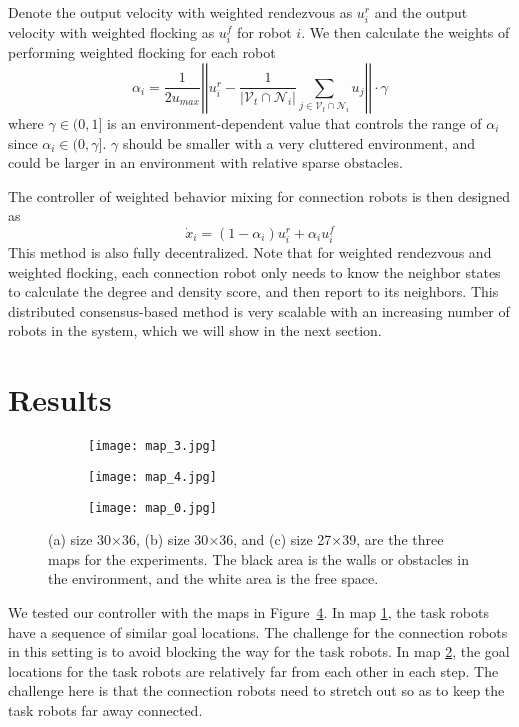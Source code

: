 \documentclass[../main.tex]{subfiles}
\begin{document}
Denote the output velocity with weighted rendezvous as $u^r_i$ and the output velocity with weighted flocking as $u^f_i$ for robot $i$. We then calculate the weights of performing weighted flocking for each robot
\begin{equation} 
\alpha_i = \frac{1}{2u_{max}}\left|\left|u_i^r - \frac{1}{|\mathcal{V}_t \cap \mathcal{N}_i|} \sum_{j \in \mathcal{V}_t \cap \mathcal{N}_i}u_j\right|\right| \cdot \gamma
\end{equation}
where $\gamma \in (0, 1]$ is an environment-dependent value that controls the range of $\alpha_i$ since $\alpha_i \in (0, \gamma]$. $\gamma$ should be smaller with a very cluttered environment, and could be larger in an environment with relative sparse obstacles.

The controller of weighted behavior mixing for connection robots is then designed as
\begin{equation} 
\dot x_i = (1 - \alpha_i) u_i^r + \alpha_i u_i^f
\end{equation}
This method is also fully decentralized. Note that for weighted rendezvous and weighted flocking, each connection robot only needs to know the neighbor states to calculate the degree and density score, and then report to its neighbors. This distributed consensus-based method is very scalable with an increasing number of robots in the system, which we will show in the next section.

\section{Results}
\begin{figure}
\centering
\begin{subfigure}{0.28\textwidth}
\texttt{[image: map\_3.jpg]}
 
\caption{}
\label{fig:map_1}
\end{subfigure}
\begin{subfigure}{0.28\textwidth}
\texttt{[image: map\_4.jpg]}
 
\caption{}
\label{fig:map_2}
\end{subfigure}
\begin{subfigure}{0.34\textwidth}
\texttt{[image: map\_0.jpg]}
 
\caption{}
\label{fig:map_3}
\end{subfigure}
\caption{(a) size 30$\times$36, (b) size 30$\times$36, and (c) size 27$\times$39, are the three maps for the experiments. The black area is the walls or obstacles in the environment, and the white area is the free space.}
\label{fig:maps}
\end{figure}
We tested our controller with the maps in Figure~\ref{fig:maps}. In map  \ref{fig:map_1}, the task robots have a sequence of similar goal locations. The challenge for the connection robots in this setting is to avoid blocking the way for the task robots. In map \ref{fig:map_2}, the goal locations for the task robots are relatively far from each other in each step. The challenge here is that the connection robots need to stretch out so as to keep the task robots far away connected.
\end{document}

